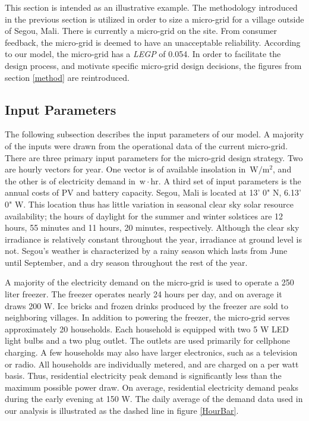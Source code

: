 \documentclass[11p]{article}
\newcommand{\unit}[1]{\ensuremath{\, \mathrm{#1}}}
\begin{document}

This section is intended as an illustrative example.
The methodology introduced in the previous section is utilized in order to size a micro-grid for a village outside of Segou, Mali.
There is currently a micro-grid on the site. 
From consumer feedback, the micro-grid is deemed to have an unacceptable reliability.
According to our model, the micro-grid has a \emph{LEGP} of 0.054.
In order to facilitate the design process, and motivate specific micro-grid design decisions, the figures from section \ref{method} are reintroduced.

\subsection{Input Parameters}

The following subsection describes the input parameters of our model.
A majority of the inputs were drawn from the operational data of the current micro-grid. 
There are three primary input parameters for the micro-grid design strategy. 
Two are hourly vectors for year. One vector is of available insolation in \unit{W/m^2}, and the other is of electricity demand in \unit{w\! \cdot \! hr}.
A third set of input parameters is the annual costs of PV and battery capacity. 
%
%
Segou, Mali is located at 13' 0" N, 6.13' 0" W. 
This location thus has little variation in seasonal clear sky solar resource availability; the hours of daylight for the summer and winter solstices are 12 hours, 55 minutes and 11 hours, 20 minutes, respectively.  
Although the clear sky irradiance is relatively constant throughout the year, irradiance at ground level is not.
Segou's weather is characterized by a rainy season which lasts from June until September, and a dry season throughout the rest of the year. 

A majority of the electricity demand on the micro-grid is used to operate
a 250 liter freezer.
The freezer operates nearly 24 hours per day, and on average it draws 200 W. 
Ice bricks and frozen drinks produced by the freezer are sold to neighboring villages.
In addition to powering the freezer, the micro-grid serves approximately 20 households.
Each household is equipped with two 5 W LED light bulbs and a two plug outlet. 
The outlets are used primarily for cellphone charging.
A few households may also have larger electronics, such as a television or radio.
All households are individually metered, and are charged on a per watt basis.
Thus, residential electricity peak demand is significantly less than the maximum possible power draw. 
On average, residential electricity demand peaks during the early evening at 150 W.
The daily average of the demand data used in our analysis is illustrated as the dashed line in figure \ref{HourBar}.
\end{document}

